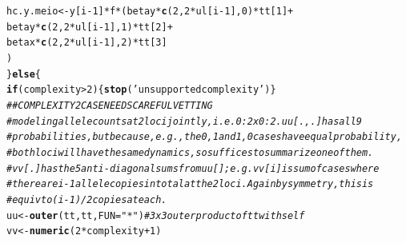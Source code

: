 \documentclass{article}\usepackage[]{graphicx}\usepackage[]{color}
\makeatletter
\newcommand{\hlnum}[1]{\textcolor[rgb]{0.686,0.059,0.569}{#1}}%
\newcommand{\hlstr}[1]{\textcolor[rgb]{0.192,0.494,0.8}{#1}}%
\newcommand{\hlcom}[1]{\textcolor[rgb]{0.678,0.584,0.686}{\textit{#1}}}%
\newcommand{\hlopt}[1]{\textcolor[rgb]{0,0,0}{#1}}%
\newcommand{\hlstd}[1]{\textcolor[rgb]{0.345,0.345,0.345}{#1}}%
\newcommand{\hlkwa}[1]{\textcolor[rgb]{0.161,0.373,0.58}{\textbf{#1}}}%
\newcommand{\hlkwb}[1]{\textcolor[rgb]{0.69,0.353,0.396}{#1}}%
\newcommand{\hlkwc}[1]{\textcolor[rgb]{0.333,0.667,0.333}{#1}}%
\newcommand{\hlkwd}[1]{\textcolor[rgb]{0.737,0.353,0.396}{\textbf{#1}}}%
\newenvironment{kframe}{%
 \def\at@end@of@kframe{}%
 \ifinner\ifhmode%
  \def\at@end@of@kframe{\end{minipage}}%
  \begin{minipage}{\columnwidth}%
 \fi\fi%
 \def\FrameCommand##1{\hskip\@totalleftmargin \hskip-\fboxsep
 \colorbox{shadecolor}{##1}\hskip-\fboxsep
     \hskip-\linewidth \hskip-\@totalleftmargin \hskip\columnwidth}%
 \MakeFramed {\advance\hsize-\width
   \@totalleftmargin\z@ \linewidth\hsize
   \@setminipage}}%
 {\par\unskip\endMakeFramed%
 \at@end@of@kframe}
\newenvironment{knitrout}{}{} %
\makeatother
\begin{document}
\begin{knitrout}
\begin{kframe}
\begin{alltt}
      \hlstd{hc.y.meio} \hlkwb{<-} \hlstd{y[i}\hlopt{-}\hlnum{1}\hlstd{]} \hlopt{*}   \hlstd{f} \hlopt{*} \hlstd{(    betay} \hlopt{*} \hlkwd{c}\hlstd{(}\hlnum{2}\hlstd{,} \hlnum{2}\hlopt{*}\hlstd{ul[i}\hlopt{-}\hlnum{1}\hlstd{],} \hlnum{0}\hlstd{)} \hlopt{*} \hlstd{tt[}\hlnum{1}\hlstd{]} \hlopt{+}
                                       \hlstd{betay} \hlopt{*} \hlkwd{c}\hlstd{(}\hlnum{2}\hlstd{,} \hlnum{2}\hlopt{*}\hlstd{ul[i}\hlopt{-}\hlnum{1}\hlstd{],} \hlnum{1}\hlstd{)} \hlopt{*} \hlstd{tt[}\hlnum{2}\hlstd{]} \hlopt{+}
                                       \hlstd{betax} \hlopt{*} \hlkwd{c}\hlstd{(}\hlnum{2}\hlstd{,} \hlnum{2}\hlopt{*}\hlstd{ul[i}\hlopt{-}\hlnum{1}\hlstd{],} \hlnum{2}\hlstd{)} \hlopt{*} \hlstd{tt[}\hlnum{3}\hlstd{]}
                                  \hlstd{)}
    \hlstd{\}} \hlkwa{else} \hlstd{\{}
      \hlkwa{if}\hlstd{(complexity} \hlopt{>} \hlnum{2}\hlstd{)\{} \hlkwd{stop}\hlstd{(}\hlstr{'unsupported complexity'}\hlstd{) \}}
      \hlcom{## COMPLEXITY 2 CASE NEEDS CAREFUL VETTING}
      \hlcom{# modeling allele counts at 2 loci jointly, i.e. 0:2 x 0:2.  uu[.,.] has all 9}
      \hlcom{# probabilities, but because, e.g., the 0,1 and 1,0 cases have equal probability,}
      \hlcom{# both loci will have the same dynamics, so suffices to summarize one of them.}
      \hlcom{# vv[.] has the 5 anti-diagonal sums from uu[]; e.g. vv[i] is sum of cases where}
      \hlcom{# there are i-1 allele copies in total at the 2 loci.  Again by symmetry, this is}
      \hlcom{# equiv to (i-1)/2 copies at each.}
      \hlstd{uu} \hlkwb{<-} \hlkwd{outer}\hlstd{(tt, tt,} \hlkwc{FUN}\hlstd{=}\hlstr{"*"}\hlstd{)}  \hlcom{# 3 x 3 outer product of tt with self}
      \hlstd{vv} \hlkwb{<-} \hlkwd{numeric}\hlstd{(}\hlnum{2}\hlopt{*}\hlstd{complexity}\hlopt{+}\hlnum{1}\hlstd{)}


\end{alltt}
\end{kframe}
\end{knitrout}
\end{document}
